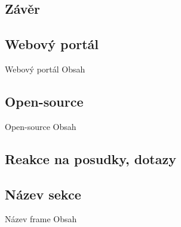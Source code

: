 \documentclass{beamer}
\begin{document}
  \begin{darkframes}
    \section{Závěr}
    \subsection{Webový portál}
    \begin{frame}{Webový portál}
     Obsah
    \end{frame}
    \subsection{Open-source}
    \begin{frame}{Open-source}
     Obsah
    \end{frame}
  \end{darkframes}
  
  \begin{frame}{}
\end{frame}
    
    
  \begin{darkframes}
    \section{Reakce na posudky, dotazy}
    \subsection{Název sekce}
    \begin{frame}{Název frame}
     Obsah
    \end{frame}
  \end{darkframes}
\end{document}
